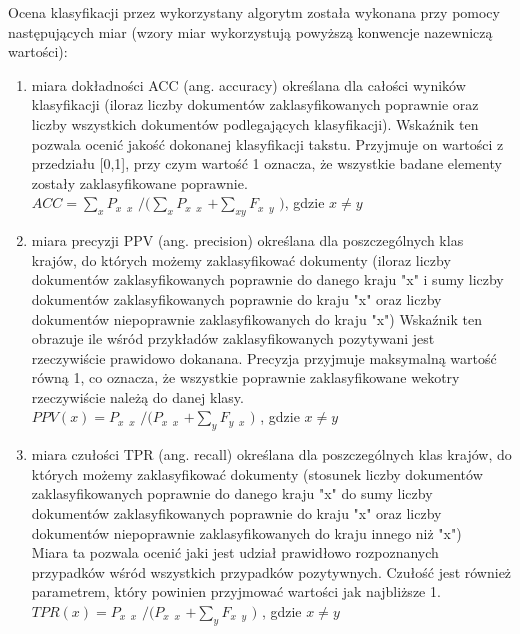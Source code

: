 \documentclass{classrep}
\begin{document}
Ocena klasyfikacji przez wykorzystany algorytm została wykonana przy pomocy następujących miar \cite{tablicapomylek} (wzory miar wykorzystują powyższą konwencje nazewniczą wartości):
\begin{enumerate}
\item miara dokładności ACC (ang. accuracy) określana dla całości wyników klasyfikacji (iloraz liczby dokumentów zaklasyfikowanych poprawnie oraz liczby wszystkich dokumentów podlegających klasyfikacji).
Wskaźnik ten pozwala ocenić jakość dokonanej klasyfikacji takstu. Przyjmuje on wartości z przedziału [0,1], przy czym wartość 1 oznacza, że wszystkie badane elementy zostały zaklasyfikowane poprawnie.\\

$ACC = \sum_{x} P$$_x$ $_x$ $ / (\sum_{x} P$$_x$ $_x$ $ + \sum_{xy}  F$$_x$ $_y$ $)$, gdzie $ x\neq y$ \\

\item miara precyzji PPV (ang. precision) określana dla poszczególnych klas krajów, do których możemy zaklasyfikować dokumenty (iloraz liczby dokumentów zaklasyfikowanych poprawnie do danego kraju "x" i sumy liczby dokumentów zaklasyfikowanych poprawnie do kraju "x" oraz liczby dokumentów niepoprawnie zaklasyfikowanych do kraju "x")
Wskaźnik ten obrazuje ile wśród przykładów zaklasyfikowanych pozytywani jest rzeczywiście prawidowo dokanana. Precyzja przyjmuje maksymalną wartość równą 1, co oznacza, że wszystkie poprawnie zaklasyfikowane wekotry rzeczywiście należą do danej klasy. \\

 $PPV(x) = P$$_x$ $_x$ $ / (P$$_x$ $_x$ $ + \sum_{y}  F$$_y$ $_x$ $)$ , gdzie $ x\neq y$ \\

\item miara czułości TPR (ang. recall) określana dla poszczególnych klas krajów, do których możemy zaklasyfikować dokumenty (stosunek liczby dokumentów zaklasyfikowanych poprawnie do danego kraju "x" do sumy liczby dokumentów zaklasyfikowanych poprawnie do kraju "x" oraz liczby dokumentów niepoprawnie zaklasyfikowanych do kraju innego niż "x")\\
Miara ta pozwala ocenić jaki jest udział prawidłowo rozpoznanych przypadków wśród wszystkich przypadków pozytywnych. Czułość jest również parametrem, który powinien przyjmować wartości jak najbliższe 1.\\

$TPR(x) = P$$_x$ $_x$ $ / (P$$_x$ $_x$ $ + \sum_{y}  F$$_x$ $_y$ $)$ , gdzie $ x\neq y$ \\
\break


\end{enumerate}
\end{document}
